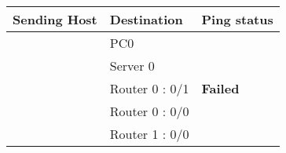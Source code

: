 \documentclass[a4paper,11pt]{article}
\begin{document}
\begin{enumerate}
\begin{enumerate}



                    \begin{table}[H]
                        \centering
                        \begin{tabular}{| m{9em}| m{12em}| m{9em} |}
                            \hline
                            {\cellcolor[rgb]{0.333,0.686,1}}\textbf{Sending Host}                & \textbf{Destination} & \multicolumn{1}{l|}{\textbf{Ping status}}                                               \\
                            \hline
                            {\cellcolor[rgb]{0.333,0.686,1}}                                     & PC0                  & \multicolumn{1}{l|}{{\cellcolor[rgb]{1,0.141,0.059}}}                                   \\
                            \hhline{|>{\arrayrulecolor[rgb]{0.333,0.686,1}}->{\arrayrulecolor{black}}->{\arrayrulecolor[rgb]{1,0.141,0.059}}->{\arrayrulecolor{black}}|}
                            {\cellcolor[rgb]{0.333,0.686,1}}                                     & Server 0             & \multicolumn{1}{l|}{{\cellcolor[rgb]{1,0.141,0.059}}}                                   \\
                            \hhline{|>{\arrayrulecolor[rgb]{0.333,0.686,1}}->{\arrayrulecolor{black}}->{\arrayrulecolor[rgb]{1,0.141,0.059}}->{\arrayrulecolor{black}}|}
                            {\cellcolor[rgb]{0.333,0.686,1}}                                     & Router 0 : 0/1       & \multicolumn{1}{l|}{\multirow{-3}{*}{{\cellcolor[rgb]{1,0.141,0.059}}\textbf{Failed} }} \\
                            \hhline{|>{\arrayrulecolor[rgb]{0.333,0.686,1}}->{\arrayrulecolor{black}}--}
                            {\cellcolor[rgb]{0.333,0.686,1}}                                     & Router 0 : 0/0       & {\cellcolor[rgb]{0.376,1,0.882}}                                                        \\
                            \hhline{|>{\arrayrulecolor[rgb]{0.333,0.686,1}}->{\arrayrulecolor{black}}->{\arrayrulecolor[rgb]{0.376,1,0.882}}-}
                            {\cellcolor[rgb]{0.333,0.686,1}}                                     & Router 1 : 0/0       & {\cellcolor[rgb]{0.376,1,0.882}}                                                        \\

\end{tabular}
\end{table}
\end{enumerate}
\end{enumerate}
\end{document}

